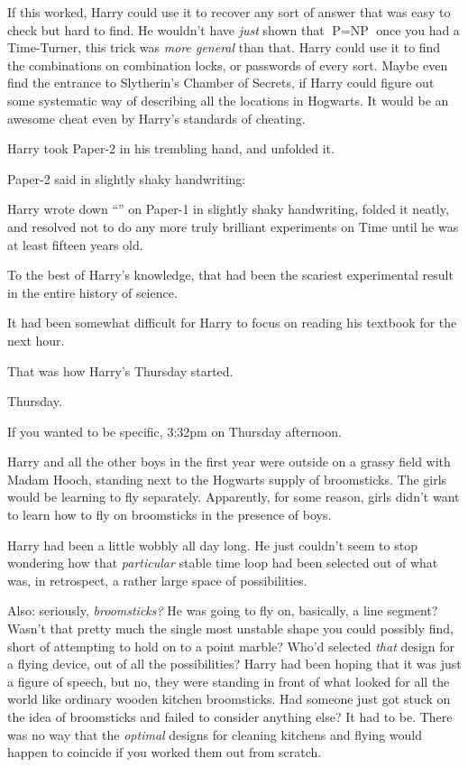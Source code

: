 If this worked, Harry could use it to recover any sort of answer that was easy to check but hard to find. He wouldn’t have \emph{just} shown that $\mbox{P}=\mbox{NP}$ once you had a Time-Turner, this trick was \emph{more general} than that. Harry could use it to find the combinations on combination locks, or passwords of every sort. Maybe even find the entrance to Slytherin’s Chamber of Secrets, if Harry could figure out some systematic way of describing all the locations in Hogwarts. It would be an awesome cheat even by Harry’s standards of cheating.

Harry took Paper-2 in his trembling hand, and unfolded it.

Paper-2 said in slightly shaky handwriting:


Harry wrote down “” on Paper-1 in slightly shaky handwriting, folded it neatly, and resolved not to do any more truly brilliant experiments on Time until he was at least fifteen years old.

To the best of Harry’s knowledge, that had been the scariest experimental result in the entire history of science.

It had been somewhat difficult for Harry to focus on reading his textbook for the next hour.

That was how Harry’s Thursday started.

\later

Thursday.

If you wanted to be specific, 3:32pm on Thursday afternoon.

Harry and all the other boys in the first year were outside on a grassy field with Madam Hooch, standing next to the Hogwarts supply of broomsticks. The girls would be learning to fly separately. Apparently, for some reason, girls didn’t want to learn how to fly on broomsticks in the presence of boys.

Harry had been a little wobbly all day long. He just couldn’t seem to stop wondering how that \emph{particular} stable time loop had been selected out of what was, in retrospect, a rather large space of possibilities.

Also: seriously, \emph{broomsticks?} He was going to fly on, basically, a line segment? Wasn’t that pretty much the single most unstable shape you could possibly find, short of attempting to hold on to a point marble? Who’d selected \emph{that} design for a flying device, out of all the possibilities? Harry had been hoping that it was just a figure of speech, but no, they were standing in front of what looked for all the world like ordinary wooden kitchen broomsticks. Had someone just got stuck on the idea of broomsticks and failed to consider anything else? It had to be. There was no way that the \emph{optimal} designs for cleaning kitchens and flying would happen to coincide if you worked them out from scratch.

